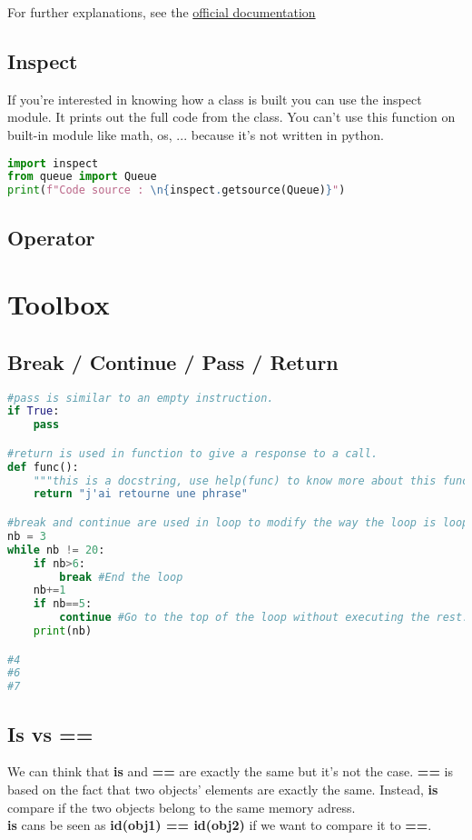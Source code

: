 \documentclass[a4paper, 12pt, titlepage]{scrartcl} %
\begin{document}
\vspace{5mm}

For further explanations, see the \href{https://docs.python.org/3/library/threading.html}{official documentation}


\subsection{Inspect}
If you're interested in knowing how a class is built you can use the inspect module. It prints out the full code from the class. You can't use this function on built-in module like math, os, ... because it's not written in python.
\begin{lstlisting}[language=Python]
import inspect
from queue import Queue
print(f"Code source : \n{inspect.getsource(Queue)}")
\end{lstlisting} \vspace{5mm}

\subsection{Operator}
\label{subsec:Operator}

\newpage
\section{Toolbox}
\subsection{Break / Continue / Pass / Return}
\label{subsec:BCPR}
\begin{lstlisting}[language=Python]
#pass is similar to an empty instruction.
if True:
    pass

#return is used in function to give a response to a call.
def func():
	"""this is a docstring, use help(func) to know more about this function."""
	return "j'ai retourne une phrase"

#break and continue are used in loop to modify the way the loop is looping.
nb = 3
while nb != 20:
	if nb>6:
		break #End the loop
	nb+=1
	if nb==5:
		continue #Go to the top of the loop without executing the rest.	
	print(nb)

#4
#6
#7
\end{lstlisting} \vspace{5mm}

\subsection{Is vs ==}
\label{subsec:Is}
We can think that \textbf{is} and \textbf{==} are exactly the same but it's not the case. \textbf{==} is based on the fact that two objects' elements are exactly the same. Instead, \textbf{is} compare if the two objects belong to the same memory adress.\\
\textbf{is} cans be seen as \textbf{id(obj1) == id(obj2)} if we want to compare it to \textbf{==}.
\end{document}
